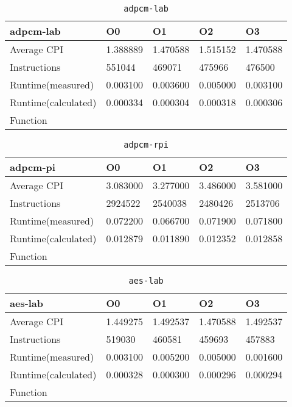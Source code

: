 \begin{table}[ht!]
\centering
\caption{\texttt{adpcm-lab}}
\label{tab:adpcm-lab}
\begin{tabular}{|l|l|l|l|l|}
\hline
\textbf{adpcm-lab}	&	\textbf{O0}	&	\textbf{O1}	&	\textbf{O2}	&	\textbf{O3}	\\\hline\hline
Average CPI	&	1.388889	&	1.470588	&	1.515152	&	1.470588	\\\hline
Instructions	&	551044	&	469071	&	475966	&	476500	\\\hline
Runtime(measured)	&	0.003100	&	0.003600	&	0.005000	&	0.003100	\\\hline
Runtime(calculated)	&	0.000334	&	0.000304	&	0.000318	&	0.000306	\\\hline
Function	&		&		&		&		\\\hline
\end{tabular}
\end{table}
\begin{table}[ht!]
\centering
\caption{\texttt{adpcm-rpi}}
\label{tab:adpcm-rpi}
\begin{tabular}{|l|l|l|l|l|}
\hline
\textbf{adpcm-pi}	&	\textbf{O0}	&	\textbf{O1}	&	\textbf{O2}	&	\textbf{O3}	\\\hline\hline
Average CPI	&	3.083000	&	3.277000	&	3.486000	&	3.581000	\\\hline
Instructions	&	2924522	&	2540038	&	2480426	&	2513706	\\\hline
Runtime(measured)	&	0.072200	&	0.066700	&	0.071900	&	0.071800	\\\hline
Runtime(calculated)	&	0.012879	&	0.011890	&	0.012352	&	0.012858	\\\hline
Function	&		&		&		&		\\\hline
\end{tabular}
\end{table}
\begin{table}[ht!]
\centering
\caption{\texttt{aes-lab}}
\label{tab:aes-lab}
\begin{tabular}{|l|l|l|l|l|}
\hline
\textbf{aes-lab}	&	\textbf{O0}	&	\textbf{O1}	&	\textbf{O2}	&	\textbf{O3}	\\\hline\hline
Average CPI	&	1.449275	&	1.492537	&	1.470588	&	1.492537	\\\hline
Instructions	&	519030	&	460581	&	459693	&	457883	\\\hline
Runtime(measured)	&	0.003100	&	0.005200	&	0.005000	&	0.001600	\\\hline
Runtime(calculated)	&	0.000328	&	0.000300	&	0.000296	&	0.000294	\\\hline
Function	&		&		&		&		\\\hline
\end{tabular}
\end{table}
